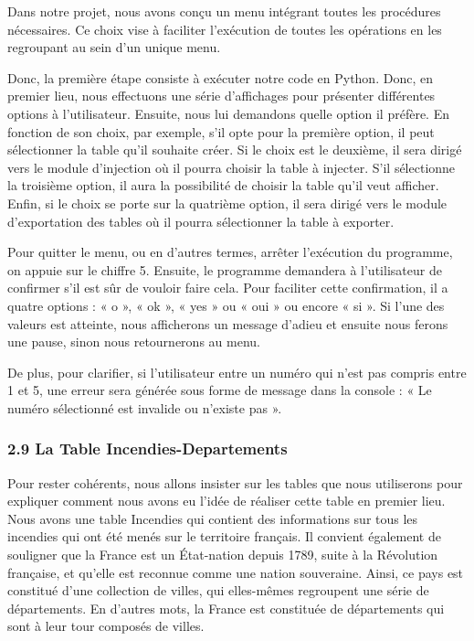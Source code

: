 \documentclass[
]{article}
\begin{document}
Dans notre projet, nous avons conçu un menu intégrant toutes les
procédures nécessaires. Ce choix vise à faciliter l'exécution de toutes
les opérations en les regroupant au sein d'un unique menu.

Donc, la première étape consiste à exécuter notre code en Python. Donc,
en premier lieu, nous effectuons une série d'affichages pour présenter
différentes options à l'utilisateur. Ensuite, nous lui demandons quelle
option il préfère. En fonction de son choix, par exemple, s'il opte pour
la première option, il peut sélectionner la table qu'il souhaite créer.
Si le choix est le deuxième, il sera dirigé vers le module d'injection
où il pourra choisir la table à injecter. S'il sélectionne la troisième
option, il aura la possibilité de choisir la table qu'il veut afficher.
Enfin, si le choix se porte sur la quatrième option, il sera dirigé vers
le module d'exportation des tables où il pourra sélectionner la table à
exporter.

Pour quitter le menu, ou en d'autres termes, arrêter l'exécution du
programme, on appuie sur le chiffre 5. Ensuite, le programme demandera à
l'utilisateur de confirmer s'il est sûr de vouloir faire cela. Pour
faciliter cette confirmation, il a quatre options : « o », « ok », « yes
» ou « oui » ou encore « si ». Si l'une des valeurs est atteinte, nous
afficherons un message d'adieu et ensuite nous ferons une pause, sinon
nous retournerons au menu.

De plus, pour clarifier, si l'utilisateur entre un numéro qui n'est pas
compris entre 1 et 5, une erreur sera générée sous forme de message dans
la console : « Le numéro sélectionné est invalide ou n'existe pas ».

\subsubsection{2.9 La Table
Incendies-Departements}\label{la-table-incendies-departements}

Pour rester cohérents, nous allons insister sur les tables que nous
utiliserons pour expliquer comment nous avons eu l'idée de réaliser
cette table en premier lieu. Nous avons une table Incendies qui contient
des informations sur tous les incendies qui ont été menés sur le
territoire français. Il convient également de souligner que la France
est un État-nation depuis 1789, suite à la Révolution française, et
qu'elle est reconnue comme une nation souveraine. Ainsi, ce pays est
constitué d'une collection de villes, qui elles-mêmes regroupent une
série de départements. En d'autres mots, la France est constituée de
départements qui sont à leur tour composés de villes.
\end{document}
